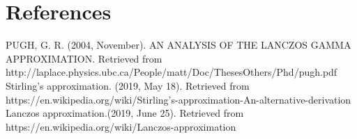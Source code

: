 \documentclass[a4paper, 11pt]{article}
\begin{document}
\section{References}
PUGH, G. R. (2004, November). AN ANALYSIS OF THE LANCZOS GAMMA APPROXIMATION. Retrieved from http://laplace.physics.ubc.ca/People/matt/Doc/ThesesOthers/Phd/pugh.pdf \\

\noindent
Stirling's approximation. (2019, May 18). Retrieved from https://en.wikipedia.org/wiki/Stirling's-approximation-An-alternative-derivation \\

\noindent
Lanczos approximation.(2019, June 25). Retrieved from https://en.wikipedia.org/wiki/Lanczos-approximation
\end{document}
